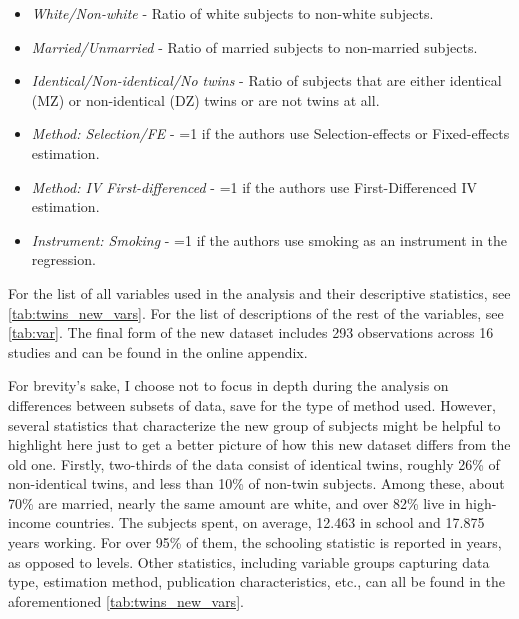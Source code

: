 \begin{itemize}
    \item \textit{White/Non-white} - Ratio of white subjects to non-white subjects.
    \item \textit{Married/Unmarried} - Ratio of married subjects to non-married subjects.
    \item \textit{Identical/Non-identical/No twins} - Ratio of subjects that are either identical (MZ) or non-identical (DZ) twins or are not twins at all.
    \item \textit{Method: Selection/FE} - =1 if the authors use  Selection-effects or Fixed-effects estimation.
    \item \textit{Method: IV First-differenced} - =1 if the authors use First-Differenced IV estimation.
    \item \textit{Instrument: Smoking} - =1 if the authors use smoking as an instrument in the regression.
\end{itemize}

For the list of all variables used in the analysis and their descriptive statistics, see \autoref{tab:twins_new_vars}. For the list of descriptions of the rest of the variables, see \autoref{tab:var}. The final form of the new dataset includes 293 observations across 16 studies and can be found in the online appendix.

For brevity's sake, I choose not to focus in depth during the analysis on differences between subsets of data, save for the type of method used. However, several statistics that characterize the new group of subjects might be helpful to highlight here just to get a better picture of how this new dataset differs from the old one. Firstly, two-thirds of the data consist of identical twins, roughly 26\% of non-identical twins, and less than 10\% of non-twin subjects. Among these, about 70\% are married, nearly the same amount are white, and over 82\% live in high-income countries. The subjects spent, on average, 12.463 in school and 17.875 years working. For over 95\% of them, the schooling statistic is reported in years, as opposed to levels. Other statistics, including variable groups capturing data type, estimation method, publication characteristics, etc., can all be found in the aforementioned \autoref{tab:twins_new_vars}.

